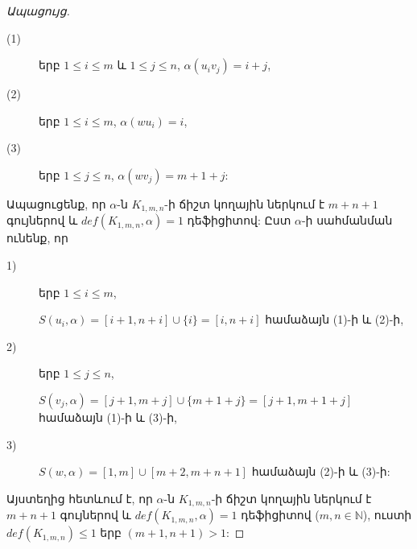\begin{hide}
\begin{proof}[Ապացույց]
\begin{description}
\item[(1)] երբ $1\leq i\leq m$ և $1\leq j\leq n$, 
$\alpha\left(u_{i}v_{j}\right)=i+j$,

\item[(2)] երբ $1\leq i\leq m$, $\alpha\left(wu_{i}\right)=i$,

\item[(3)] երբ $1\leq j\leq n$, $\alpha\left(wv_{j}\right)=m+1+j$:
\end{description} %

Ապացուցենք, որ $\alpha$-ն $K_{1,m,n}$-ի ճիշտ կողային ներկում է $m+n+1$ գույներով և  $def\left(K_{1,m,n},\alpha\right)=1$ դեֆիցիտով: Ըստ $\alpha$-ի սահմանման ունենք, որ
\begin{description}
\item[1)] երբ $1\leq i\leq m$,

$S\left(u_{i},\alpha\right)=[i+1,n+i]\cup \{i\}=[i,n+i]$ համաձայն (1)-ի և (2)-ի,

\item[2)] երբ $1\leq j\leq n$,

$S\left(v_{j},\alpha\right)=[j+1,m+j]\cup \{m+1+j\}=[j+1,m+1+j]$ համաձայն (1)-ի և (3)-ի,

\item[3)] $S\left(w,\alpha\right)=[1,m]\cup [m+2,m+n+1]$
համաձայն (2)-ի և (3)-ի:
\end{description} %

Այստեղից հետևում է, որ $\alpha$-ն $K_{1,m,n}$-ի ճիշտ կողային ներկում է $m+n+1$ գույներով և $def\left(K_{1,m,n},\alpha\right)=1$ դեֆիցիտով
($m,n\in \mathbb{N}$), ուստի $def\left(K_{1,m,n}\right)\leq 1$ երբ
$(m+1,n+1)>1$:
\end{proof}
\end{hide}